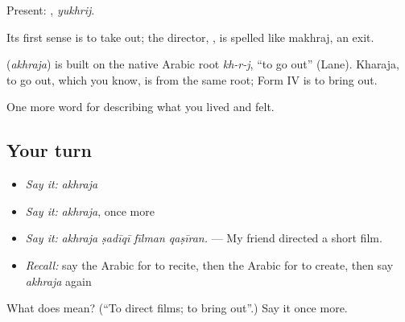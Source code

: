 Present: , \emph{yukhrij}.

Its first sense is to take out; the director, , is spelled like makhraj, an exit.

\begin{cousinweb}
\textbf{} (\emph{akhraja}) is built on the native Arabic root \emph{kh-r-j}, \textquotedblleft{}to go out\textquotedblright{} (Lane). Kharaja, to go out, which you know, is from the same root; Form IV is to bring out.
\end{cousinweb}

\begin{grammarlens}[title={What you've built}]
One more word for describing what you lived and felt.
\end{grammarlens}

\subsection*{Your turn}
\begin{itemize}
\raggedright
  \item \emph{Say it:} \emph{akhraja}
  \item \emph{Say it:} \emph{akhraja}, once more
  \item \emph{Say it:} \emph{akhraja ṣadīqī fīlman qaṣīran.} — My friend directed a short film.
  \item \emph{Recall:} say the Arabic for to recite, then the Arabic for to create, then say \emph{akhraja} again
\end{itemize}

\begin{tcolorbox}[breakable,colback=teal!4,colframe=teal!35!black,title={Before you move on}]
What does  mean? (\textquotedblleft{}To direct films; to bring out\textquotedblright{}.) Say it once more.
\end{tcolorbox}

